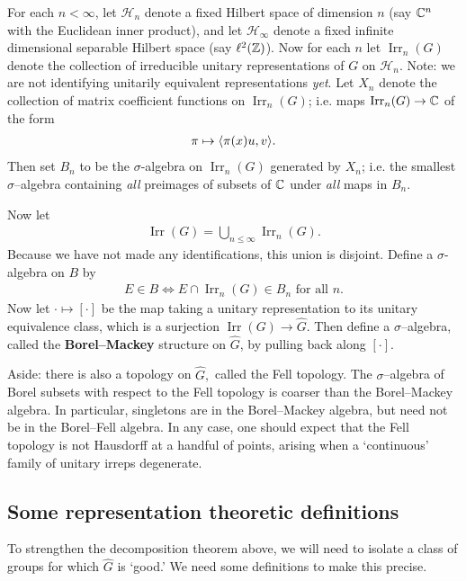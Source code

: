 \documentclass[11pt]{amsart}
\renewcommand{\H}{\mathcal{H}}
\newcommand{\irr}{\operatorname{Irr}}
\begin{document}
	\par For each $n<\infty$, let $\H_{n}$ denote a fixed Hilbert space of dimension $n$ (say $\mathbb{C}^{n}$ with the Euclidean inner product), and let $\H_{\infty}$ denote a fixed infinite dimensional separable Hilbert space (say $\ell^{2}(\mathbb{Z})$). Now for each $n$ let $\irr_{n}(G)$ denote the collection of irreducible unitary representations of $G$ on $\H_{n}$. Note: we are not identifying unitarily equivalent representations \emph{yet}. Let $X_{n}$ denote the collection of matrix coefficient functions on $\irr_{n}(G)$; i.e. maps $\irr_{n}(G) \to \C$ of the form 
	\begin{align*}
		\pi \mapsto \langle \pi(x)u, v \rangle.
	\end{align*}
Then set $B_{n}$ to be the $\sigma$-algebra on $\irr_{n}(G)$ generated by $X_{n}$; i.e. the smallest $\sigma$--algebra containing  \emph{all} preimages of subsets of $\mathbb{C}$ under \emph{all} maps in $B_{n}$.
 
 \par Now let
	\begin{align*}
		\irr(G)= \bigcup_{n\leq \infty} \irr_{n}(G).
	\end{align*}
Because we have not made any identifications, this union is disjoint. Define a $\sigma$-algebra on $B$ by 
	\begin{align*}
		E \in B \iff E\cap \irr_{n}(G) \in B_{n} \text{ for all $n$}.
	\end{align*}
Now let $\cdot \mapsto [ \cdot ]$ be the map taking a unitary representation to its unitary equivalence class, which is a surjection $\irr(G) \to \hat{G}$. Then define a $\sigma$--algebra, called the {\bf Borel--Mackey} structure on $\hat{G}$, by pulling back along $[\cdot]$. 


\par Aside: there is also a topology on $\hat{G},$ called the Fell topology. The $\sigma$--algebra of Borel subsets with respect to the Fell topology is coarser than the Borel--Mackey algebra. In particular, singletons are in the Borel--Mackey algebra, but need not be in the Borel--Fell algebra. In any case, one should expect that the Fell topology is not Hausdorff at a handful of points, arising when a `continuous' family of unitary irreps degenerate. 
\subsection{Some representation theoretic definitions}
To strengthen the decomposition theorem above, we will need to isolate a class of groups for which $\hat{G}$ is `good.' We need some definitions to make this precise. 
\end{document}
